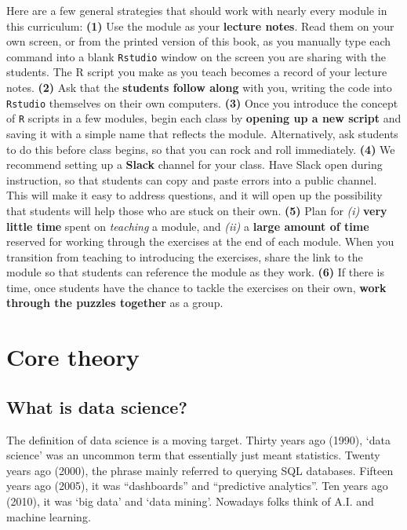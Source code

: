 \documentclass[
]{book}
\begin{document}
Here are a few general strategies that should work with nearly every module in this curriculum: \textbf{(1)} Use the module as your \textbf{lecture notes}. Read them on your own screen, or from the printed version of this book, as you manually type each command into a blank \texttt{Rstudio} window on the screen you are sharing with the students. The R script you make as you teach becomes a record of your lecture notes. \textbf{(2)} Ask that the \textbf{students follow along} with you, writing the code into \texttt{Rstudio} themselves on their own computers. \textbf{(3)} Once you introduce the concept of \texttt{R} scripts in a few modules, begin each class by \textbf{opening up a new script} and saving it with a simple name that reflects the module. Alternatively, ask students to do this before class begins, so that you can rock and roll immediately. \textbf{(4)} We recommend setting up a \textbf{Slack} channel for your class. Have Slack open during instruction, so that students can copy and paste errors into a public channel. This will make it easy to address questions, and it will open up the possibility that students will help those who are stuck on their own. \textbf{(5)} Plan for \emph{(i)} \textbf{very little time} spent on \emph{teaching} a module, and \emph{(ii)} a \textbf{large amount of time} reserved for working through the exercises at the end of each module. When you transition from teaching to introducing the exercises, share the link to the module so that students can reference the module as they work. \textbf{(6)} If there is time, once students have the chance to tackle the exercises on their own, \textbf{work through the puzzles together} as a group.

\hypertarget{part-core-theory}{%
\part{Core theory}\label{part-core-theory}}

\hypertarget{what-is-data-science}{%
\chapter{What is data science?}\label{what-is-data-science}}

The definition of data science is a moving target. Thirty years ago (1990), `data science' was an uncommon term that essentially just meant statistics. Twenty years ago (2000), the phrase mainly referred to querying SQL databases. Fifteen years ago (2005), it was ``dashboards'' and ``predictive analytics''. Ten years ago (2010), it was `big data' and `data mining'. Nowadays folks think of A.I. and machine learning.
\end{document}
